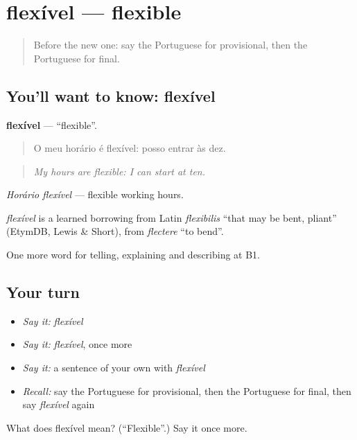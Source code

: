 \section[flexível]{flexível — flexible}

\label{lesson:PT-C372-flexivel}



\begin{quote}
Before the new one: say the Portuguese for provisional, then the Portuguese for final.
\end{quote}

\subsection*{You'll want to know: flexível}
\textbf{flexível} — \textquotedblleft{}flexible\textquotedblright{}.

\begin{quote}
O meu horário é flexível: posso entrar às dez.
\end{quote}

\begin{quote}
\emph{My hours are flexible: I can start at ten.}
\end{quote}

\emph{Horário flexível} — flexible working hours.

\begin{cousinweb}
\emph{flexível} is a learned borrowing from Latin \emph{flexibilis} \textquotedblleft{}that may be bent, pliant\textquotedblright{} (EtymDB, Lewis \& Short), from \emph{flectere} \textquotedblleft{}to bend\textquotedblright{}.
\end{cousinweb}

\begin{grammarlens}[title={What you've built}]
One more word for telling, explaining and describing at B1.
\end{grammarlens}

\subsection*{Your turn}
\begin{itemize}
\raggedright
  \item \emph{Say it:} \emph{flexível}
  \item \emph{Say it:} \emph{flexível}, once more
  \item \emph{Say it:} a sentence of your own with \emph{flexível}
  \item \emph{Recall:} say the Portuguese for provisional, then the Portuguese for final, then say \emph{flexível} again
\end{itemize}

\begin{tcolorbox}[breakable,colback=teal!4,colframe=teal!35!black,title={Before you move on}]
What does flexível mean? (\textquotedblleft{}Flexible\textquotedblright{}.) Say it once more.
\end{tcolorbox}
